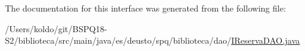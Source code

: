 The documentation for this interface was generated from the following file\+:\begin{DoxyCompactItemize}
\item 
/\+Users/koldo/git/\+B\+S\+P\+Q18-\/\+S2/biblioteca/src/main/java/es/deusto/spq/biblioteca/dao/\mbox{\hyperlink{_i_reserva_d_a_o_8java}{I\+Reserva\+D\+A\+O.\+java}}\end{DoxyCompactItemize}
